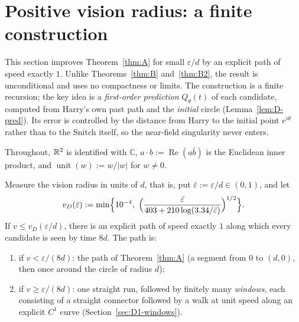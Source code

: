 
\section{Positive vision radius: a finite construction}\label{sec:D1}

This section improves Theorem~\ref{thm:A} for small $\varepsilon/d$ by an explicit path of speed exactly $1$. Unlike
Theorems~\ref{thm:B} and~\ref{thm:B2}, the result is unconditional and uses no compactness or limits. The construction is
a finite recursion; the key idea is a \emph{first-order prediction} $Q_\theta(t)$ of each candidate, computed from Harry's own
past path and the \emph{initial} circle (Lemma~\ref{lem:D-pred}). Its error is controlled by the distance from Harry to the
initial point $e^{i\theta}$ rather than to the Snitch itself, so the near-field singularity never enters.

Throughout, $\mathbb{R}^2$ is identified with $\mathbb C$, $a\cdot b:=\operatorname{Re}(a\bar b)$ is the Euclidean inner product,
and $\operatorname{unit}(w):=w/|w|$ for $w\neq0$.

\begin{theorem}[D1]\label{thm:D1}
Measure the vision radius in units of $d$, that is, put $\bar\varepsilon:=\varepsilon/d\in(0,1)$, and let
\begin{equation}\label{eq:D-vD}
v_D(\bar\varepsilon):=\min\Bigl\{10^{-4},\ \Bigl(\frac{\bar\varepsilon}{403+210\log(3.34/\bar\varepsilon)}\Bigr)^{1/2}\Bigr\}.
\end{equation}
If $v\le v_D(\varepsilon/d)$, there is an explicit path of speed exactly $1$ along which every candidate is seen by time $8d$.
The path is:
\begin{enumerate}
\item[(a)] if $v<\varepsilon/(8d)$: the path of Theorem~\ref{thm:A} (a segment from $0$ to $(d,0)$, then once around the
circle of radius $d$);
\item[(b)] if $v\ge\varepsilon/(8d)$: one straight run, followed by finitely many \emph{windows}, each consisting of a
straight connector followed by a walk at unit speed along an explicit $C^1$ curve (Section~\ref{sec:D1-windows}).
\end{enumerate}
\end{theorem}

